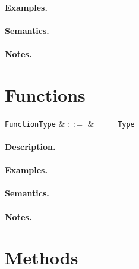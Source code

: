 \paragraph{Examples.}

\paragraph{Semantics.}

\paragraph{Notes.} 


\section{Functions}

\begin{syntax}
  \verb+FunctionType+ & $::=$ & \ \token{(}\
  \ \token{)}\ \token{=>}\ \verb+Type+\\
\end{syntax}

\paragraph{Description.}  

\paragraph{Examples.}

\paragraph{Semantics.}

\paragraph{Notes.}


\section{Methods}

